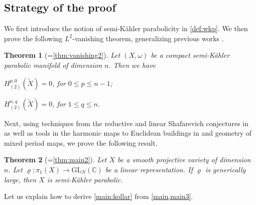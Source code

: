 \documentclass[11pt,a4paper,english]{smfart}
\theoremstyle{plain}
\newtheorem{thmx}{Theorem}
\theoremstyle{definition}
\theoremstyle{plain}
\newcommand\GL{\mathrm{GL}}
\def\bC{\mathbb{C}}
\begin{document}
	\subsection{Strategy of the proof}
	We first introduce the notion of semi-K\"ahler parabolicity in \cref{def:wkp}. We then prove the following $L^2$-vanishing theorem, generalizing previous works \cite{Gr,Esy97,CX,JZ,BDET22}. %
	\begin{thmx}[=\cref{thm:vanishing2}]\label{main3}
		Let $(X,\omega)$ be a   compact  semi-K\"ahler parabolic manifold of dimension $n$.  Then 	we have \begin{thmenum}[resume]
			\item \label{item:vanishing2}$H^{p,0}_{(2)}(\widetilde{X})=0$, \;for\;  $0\leq p\leq n-1$;
			\item \label{item:L2} $H^{n,q}_{(2)}(\widetilde{X})=0$, \;for\; $1\leq q\leq n$. 
		\end{thmenum}
	\end{thmx}
	Next, using techniques from the reductive and linear Shafarevich conjectures in \cite{DY23,EKPR12} as well as tools in the harmonic maps to Euclidean buildings in \cite{GS92,BDDM} and geometry of mixed period maps,%
	we prove the following result.
	\begin{thmx}[=\cref{thm:main2}]\label{main}
		Let $X$ be a smooth projective variety of dimension $n$. Let $\varrho:\pi_1(X)\to \GL_N(\bC)$ be a linear representation. 
	 If $\varrho$ is  generically large,  then  $X$ is semi-K\"ahler parabolic. %
	\end{thmx}   
	Let us explain how to derive \cref{main:kollar} from \cref{main,main3}.
	 
\end{document}
